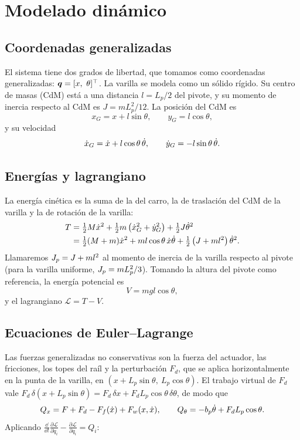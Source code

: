 \chapter{Modelado dinámico}
\label{cap:modelo}

\section{Coordenadas generalizadas}

El sistema tiene dos grados de libertad, que tomamos como coordenadas generalizadas: $\vect{q}=[x,\ \theta]^\top$. La varilla se modela como un sólido rígido. Su centro de masas (CdM) está a una distancia $l=L_p/2$ del pivote, y su momento de inercia respecto al CdM es $J=mL_p^2/12$. La posición del CdM es
\begin{equation}
  x_G = x + l\sin\theta, \qquad y_G = l\cos\theta,
\end{equation}
y su velocidad
\begin{equation}
  \dot{x}_G = \dot{x} + l\cos\theta\,\dot{\theta}, \qquad \dot{y}_G = -l\sin\theta\,\dot{\theta} .
\end{equation}

\section{Energías y lagrangiano}

La energía cinética es la suma de la del carro, la de traslación del CdM de la varilla y la de rotación de la varilla:
\begin{align}
  T &= \tfrac12 M\dot{x}^2 + \tfrac12 m\left(\dot{x}_G^2+\dot{y}_G^2\right) + \tfrac12 J\dot{\theta}^2 \nonumber\\
    &= \tfrac12 (M+m)\dot{x}^2 + m l\cos\theta\,\dot{x}\dot{\theta} + \tfrac12\left(J+ml^2\right)\dot{\theta}^2 .
  \label{eq:T}
\end{align}
Llamaremos $J_p = J+ml^2$ al momento de inercia de la varilla respecto al pivote (para la varilla uniforme, $J_p=mL_p^2/3$). Tomando la altura del pivote como referencia, la energía potencial es
\begin{equation}
  V = m g l\cos\theta ,
\end{equation}
y el lagrangiano $\mathcal{L}=T-V$.

\section{Ecuaciones de Euler--Lagrange}

Las fuerzas generalizadas no conservativas son la fuerza del actuador, las fricciones, los topes del raíl y la perturbación $F_d$, que se aplica horizontalmente en la punta de la varilla, en $(x+L_p\sin\theta,\ L_p\cos\theta)$. El trabajo virtual de $F_d$ vale $F_d\,\delta(x+L_p\sin\theta)=F_d\,\delta x + F_dL_p\cos\theta\,\delta\theta$, de modo que
\begin{equation}
  Q_x = F + F_d - F_f(\dot{x}) + F_w(x,\dot{x}), \qquad Q_\theta = -b_p\dot{\theta} + F_dL_p\cos\theta .
\end{equation}
Aplicando $\frac{\dd}{\dd t}\frac{\partial\mathcal L}{\partial\dot q_i}-\frac{\partial\mathcal L}{\partial q_i}=Q_i$:

